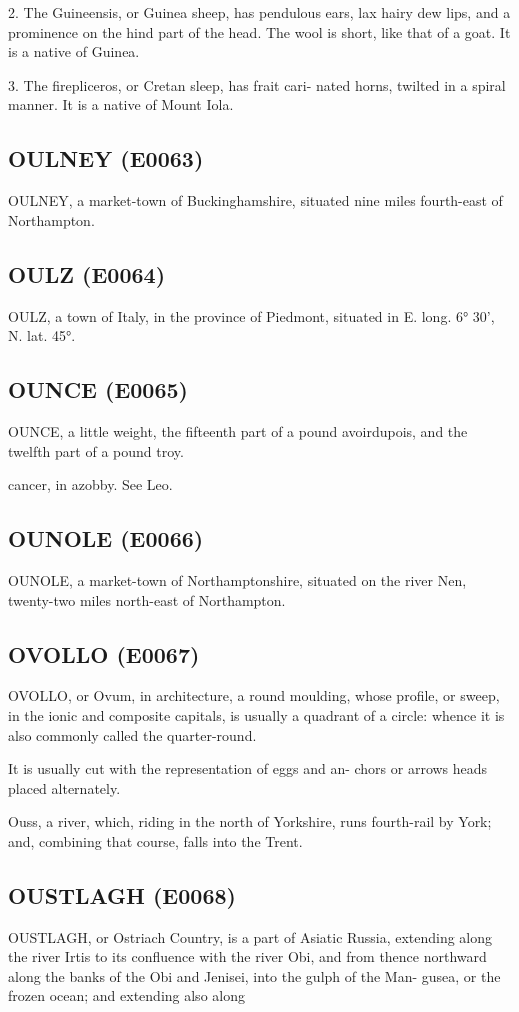 \documentclass{article}
\begin{document}
2. The Guineensis, or Guinea sheep, has pendulous ears, lax hairy dew lips, and a prominence on the hind part of the head. The wool is short, like that of a goat. It is a native of Guinea.

3. The firepliceros, or Cretan sleep, has frait cari- nated horns, twilted in a spiral manner. It is a native of Mount Iola.

\subsection*{OULNEY (E0063)}
OULNEY, a market-town of Buckinghamshire, situated nine miles fourth-east of Northampton.

\subsection*{OULZ (E0064)}
OULZ, a town of Italy, in the province of Piedmont, situated in E. long. 6° 30', N. lat. 45°.

\subsection*{OUNCE (E0065)}
OUNCE, a little weight, the fifteenth part of a pound avoirdupois, and the twelfth part of a pound troy.

cancer, in azobby. See Leo.

\subsection*{OUNOLE (E0066)}
OUNOLE, a market-town of Northamptonshire, situated on the river Nen, twenty-two miles north-east of Northampton.

\subsection*{OVOLLO (E0067)}
OVOLLO, or Ovum, in architecture, a round moulding, whose profile, or sweep, in the ionic and composite capitals, is usually a quadrant of a circle: whence it is also commonly called the quarter-round.

It is usually cut with the representation of eggs and an-
chors or arrows heads placed alternately.

Ouss, a river, which, riding in the north of Yorkshire, runs fourth-rail by York; and, combining that course, falls into the Trent.

\subsection*{OUSTLAGH (E0068)}
OUSTLAGH, or Ostriach Country, is a part of Asiatic Russia, extending along the river Irtis to its confluence with the river Obi, and from thence northward along the banks of the Obi and Jenisei, into the gulph of the Man- gusea, or the frozen ocean; and extending also along
\end{document}
